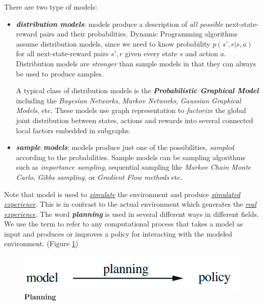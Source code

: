 \documentclass[11pt]{article}
\begin{document}
There are two type of models:
\begin{itemize}
\item \emph{\textbf{distribution models}}: models produce a description of \emph{all possible} next-state-reward pairs and their probabilities. Dynamic Programming algorithms assume distribution models, since we need to know probability $p(s', r| s, a)$ for all next-state-reward pairs $s', r$ given every state $s$ and action $a$. Distribution models are \emph{stronger} than sample models in that they can always be used to produce samples. 

A typical class of distribution models is the \textbf{\emph{Probabilistic Graphical Model}} \citep{koller2009probabilistic} including the \emph{Bayesian Networks}, \emph{Markov Networks}, \emph{Gaussian  Graphical Models}, etc. These models use graph representation to \emph{factorize} the global joint distribution between states, actions and rewards into several connected local factors embedded in subgraphs. 


\item \emph{\textbf{sample models}}:  models produce just one of the possibilities, \emph{sampled} according to the probabilities. Sample models can be sampling algorithms such as \emph{importance sampling}, sequential sampling like \emph{Markov Chain Monte Carlo}, \emph{Gibbs sampling}, or \emph{Gradient Flow methods} etc.
\end{itemize}
Note that model is used to \underline{\emph{simulate}} the environment and produce \underline{\emph{simulated experience}}. This is in contrast to the actual environment which generates the  \underline{\emph{real experience}}. The word \textbf{\emph{planning}} is used in several different ways in different fields. We use the term to refer to any computational process that takes a model as input and produces or improves a policy for interacting with the modeled environment. (Figure \ref{fig: planning})

\begin{figure}
\begin{minipage}[t]{1\linewidth}
  \centering
  \centerline{\includegraphics[scale = 0.3]{planning.png}}
\end{minipage}
\caption{\footnotesize{\textbf{Planning}}}
\label{fig: planning}
\end{figure}
\end{document}
